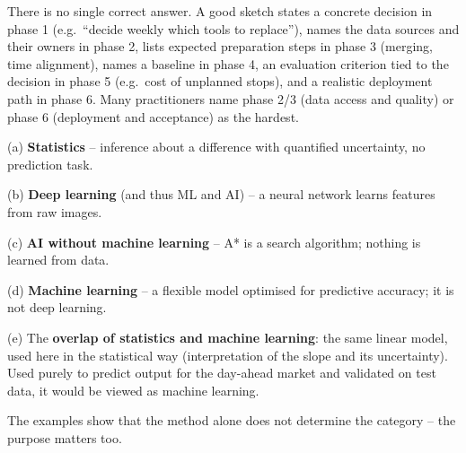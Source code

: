 \documentclass[
  letterpaper,
  DIV=11,
  numbers=noendperiod]{scrreprt}
\begin{document}
\begin{tcolorbox}[enhanced jigsaw, left=2mm, title=\textcolor{quarto-callout-caution-color}{\faFire}\hspace{0.5em}{Solution to Exercise 3}, opacityback=0, breakable, rightrule=.15mm, arc=.35mm, toptitle=1mm, colbacktitle=quarto-callout-caution-color!10!white, opacitybacktitle=0.6, coltitle=black, colframe=quarto-callout-caution-color-frame, bottomrule=.15mm, leftrule=.75mm, bottomtitle=1mm, titlerule=0mm, toprule=.15mm, colback=white]

There is no single correct answer. A good sketch states a concrete
decision in phase 1 (e.g.~``decide weekly which tools to replace''),
names the data sources and their owners in phase 2, lists expected
preparation steps in phase 3 (merging, time alignment), names a baseline
in phase 4, an evaluation criterion tied to the decision in phase 5
(e.g.~cost of unplanned stops), and a realistic deployment path in phase
6. Many practitioners name phase 2/3 (data access and quality) or phase
6 (deployment and acceptance) as the hardest.

\end{tcolorbox}

\begin{tcolorbox}[enhanced jigsaw, left=2mm, title=\textcolor{quarto-callout-caution-color}{\faFire}\hspace{0.5em}{Solution to Exercise 4}, opacityback=0, breakable, rightrule=.15mm, arc=.35mm, toptitle=1mm, colbacktitle=quarto-callout-caution-color!10!white, opacitybacktitle=0.6, coltitle=black, colframe=quarto-callout-caution-color-frame, bottomrule=.15mm, leftrule=.75mm, bottomtitle=1mm, titlerule=0mm, toprule=.15mm, colback=white]

(a) \textbf{Statistics} -- inference about a difference with quantified
uncertainty, no prediction task.

(b) \textbf{Deep learning} (and thus ML and AI) -- a neural network
learns features from raw images.

(c) \textbf{AI without machine learning} -- A* is a search algorithm;
nothing is learned from data.

(d) \textbf{Machine learning} -- a flexible model optimised for
predictive accuracy; it is not deep learning.

(e) The \textbf{overlap of statistics and machine learning}: the same
linear model, used here in the statistical way (interpretation of the
slope and its uncertainty). Used purely to predict output for the
day-ahead market and validated on test data, it would be viewed as
machine learning.

The examples show that the method alone does not determine the category
-- the purpose matters too.

\end{tcolorbox}
\end{document}
